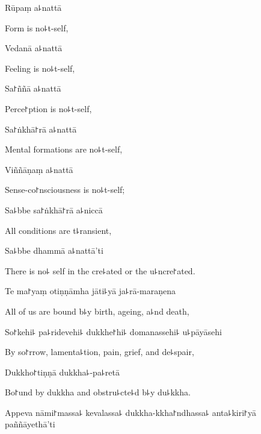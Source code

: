 Rūpaṃ a꜕nattā

\begin{english}
  Form is no꜕t-self,
\end{english}

Vedanā a꜕nattā

\begin{english}
  Feeling is no꜕t-self,
\end{english}

Sa꜓ññā a꜕nattā

\begin{english}
  Perce꜓ption is no꜕t-self,
\end{english}

Sa꜓ṅkhā꜓rā a꜕nattā

\begin{english}
  Mental formations are no꜕t-self,
\end{english}

Viññāṇaṃ a꜕nattā

\begin{english}
  Sense-co꜓nsciousness is no꜕t-self;
\end{english}

Sa꜕bbe sa꜓ṅkhā꜓rā a꜕niccā

\begin{english}
  All conditions are t꜕ransient,
\end{english}

Sa꜕bbe dhammā a꜕nattā'ti

\begin{english}
  There is no꜕ self in the cre꜕ated or the u꜕ncre꜓ated.
\end{english}

Te ma꜓yaṃ otiṇṇāmha jāti꜕yā ja꜕rā-maraṇena

\begin{english}
  All of us are bound b꜕y birth, ageing, a꜕nd death,
\end{english}

So꜓kehi꜕ pa꜕ridevehi꜕ dukkhe꜓hi꜕ domanassehi꜕ u꜕pāyāsehi

\begin{english}
  By so꜓rrow, lamenta꜕tion, pain, grief, and de꜕spair,
\end{english}

Dukkho꜓tiṇṇā dukkha꜕-pa꜕retā

\begin{english}
  Bo꜓und by dukkha and obstru꜕cte꜕d b꜕y du꜕kkha.
\end{english}

Appeva nāmi꜓massa꜕ kevalassa꜕ dukkha-kkha꜓ndhassa꜕ anta꜕kiri꜓yā \\paññāyethā'ti

